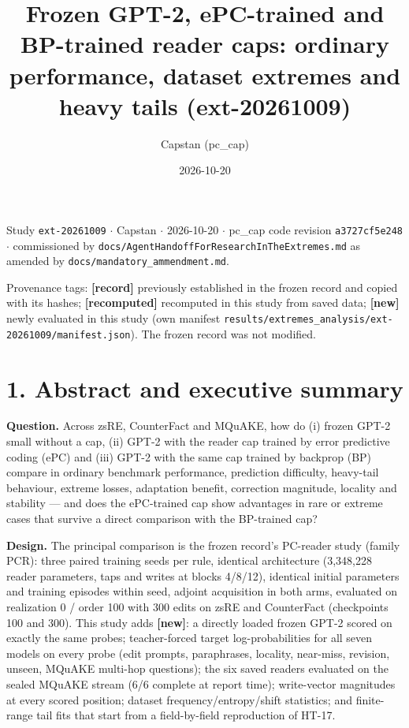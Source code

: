 \documentclass[10pt,a4paper]{article}
\title{Frozen GPT-2, ePC-trained and BP-trained reader caps: ordinary performance, dataset extremes and heavy tails (ext-20261009)}\author{Capstan (pc\_cap)}\date{2026-10-20}
\begin{document}
\maketitle\tableofcontents\clearpage


Study \texttt{ext-20261009} $\cdot$ Capstan $\cdot$ 2026-10-20 $\cdot$ pc\_cap code revision \texttt{a3727cf5e248} $\cdot$ commissioned by \texttt{docs/AgentHandoffForResearchInTheExtremes.md} as amended by \texttt{docs/mandatory\_ammendment.md}.



Provenance tags: \textbf{[record]} previously established in the frozen record and copied with its hashes; \textbf{[recomputed]} recomputed in this study from saved data; \textbf{[new]} newly evaluated in this study (own manifest \texttt{results/extremes\_analysis/ext-20261009/manifest.json}). The frozen record was not modified.



\section*{1. Abstract and executive summary}



\textbf{Question.} Across zsRE, CounterFact and MQuAKE, how do (i) frozen GPT-2 small without a cap, (ii) GPT-2 with the reader cap trained by error predictive coding (ePC) and (iii) GPT-2 with the same cap trained by backprop (BP) compare in ordinary benchmark performance, prediction difficulty, heavy-tail behaviour, extreme losses, adaptation benefit, correction magnitude, locality and stability — and does the ePC-trained cap show advantages in rare or extreme cases that survive a direct comparison with the BP-trained cap?



\textbf{Design.} The principal comparison is the frozen record's PC-reader study (family PCR): three paired training seeds per rule, identical architecture (3,348,228 reader parameters, taps and writes at blocks 4/8/12), identical initial parameters and training episodes within seed, adjoint acquisition in both arms, evaluated on realization 0 / order 100 with 300 edits on zsRE and CounterFact (checkpoints 100 and 300). This study adds \textbf{[new]}: a directly loaded frozen GPT-2 scored on exactly the same probes; teacher-forced target log-probabilities for all seven models on every probe (edit prompts, paraphrases, locality, near-miss, revision, unseen, MQuAKE multi-hop questions); the six saved readers evaluated on the sealed MQuAKE stream (6/6 complete at report time); write-vector magnitudes at every scored position; dataset frequency/entropy/shift statistics; and finite-range tail fits that start from a field-by-field reproduction of HT-17.
\end{document}
